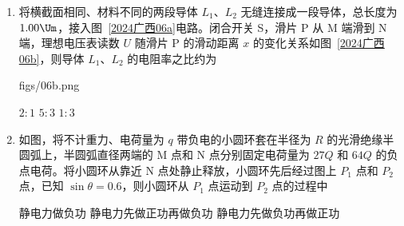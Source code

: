 \documentclass[\gkver]{gaokaozhenti}
\begin{document}
\begin{enumerate}
{根据几何关系可得 P 点至 O 点的距离

$L_{P0} = r + \frac{r}{\cos45^{\circ}} = (1 + \sqrt{2})\frac{mv}{qB}$

故选 C。
}

\item
将横截面相同、材料不同的两段导体 $L_{1}$、$L_{2}$ 无缝连接成一段导体，总长度为 $1.00 \Um$，接入图~\ref{2024广西06a}电路。闭合开关 S，滑片 P 从 M 端滑到 N 端，理想电压表读数 $U$ 随滑片 P 的滑动距离 $x$ 的变化关系如图~\ref{2024广西06b}，则导体 $L_{1}$、$L_{2}$ 的电阻率之比约为

{figs/06b.png}

{$2:1$}
{$5:3$}
{$1:3$}


\item
如图，将不计重力、电荷量为 $q$ 带负电的小圆环套在半径为 $R$ 的光滑绝缘半圆弧上，半圆弧直径两端的 M 点和 N 点分别固定电荷量为 $27Q$ 和 $64Q$ 的负点电荷。将小圆环从靠近 N 点处静止释放，小圆环先后经过图上 $P_{1}$ 点和 $P_{2}$ 点，已知 $\sin\theta = 0.6$，则小圆环从 $P_{1}$ 点运动到 $P_{2}$ 点的过程中


{静电力做负功}
{静电力先做正功再做负功}
{静电力先做负功再做正功}

\end{enumerate}
\end{document}
